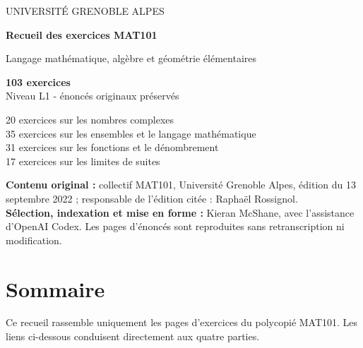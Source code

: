 \documentclass[11pt,a4paper]{article}
\begin{document}

\begin{titlepage}
  \color{ink}
  \vspace*{2.2cm}

  {\Large UNIVERSITÉ GRENOBLE ALPES\par}
  \vspace{1.4cm}

  {\Huge\bfseries Recueil des exercices MAT101\par}
  \vspace{0.55cm}
  {\LARGE Langage mathématique, algèbre et géométrie élémentaires\par}

  \vspace{1.6cm}
  \colorbox{soft}{%
    \parbox{\dimexpr\linewidth-2\fboxsep\relax}{%
      \centering
      \vspace{0.8em}
      {\Huge\color{accent}\bfseries 103 exercices}\\[0.45em]
      {\large Niveau L1 - énoncés originaux préservés}
      \vspace{0.8em}
    }%
  }

  \vfill
  {\large
    20 exercices sur les nombres complexes\\[0.25em]
    35 exercices sur les ensembles et le langage mathématique\\[0.25em]
    31 exercices sur les fonctions et le dénombrement\\[0.25em]
    17 exercices sur les limites de suites
  \par}

  \vfill
  {\small
    \textbf{Contenu original :} collectif MAT101, Université Grenoble Alpes,
    édition du 13 septembre 2022 ; responsable de l'édition citée :
    Raphaël Rossignol.\\[0.35em]
    \textbf{Sélection, indexation et mise en forme :} Kieran McShane,
    avec l'assistance d'OpenAI Codex. Les pages d'énoncés sont reproduites
    sans retranscription ni modification.
  \par}
\end{titlepage}
\setcounter{page}{2}

\section*{Sommaire}

Ce recueil rassemble uniquement les pages d'exercices du polycopié MAT101.
Les liens ci-dessous conduisent directement aux quatre parties.
\end{document}
